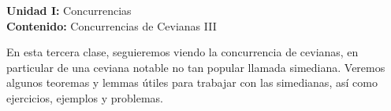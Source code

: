 {\Large
    \textbf{Unidad I:} Concurrencias\vspace{2mm}\\
    \textbf{Contenido:} Concurrencias de Cevianas III
}

En esta tercera clase, seguieremos viendo la concurrencia de cevianas, en particular de una ceviana notable no tan popular llamada simediana.
Veremos algunos teoremas y lemmas útiles para trabajar con las simedianas, así como ejercicios, ejemplos y problemas.